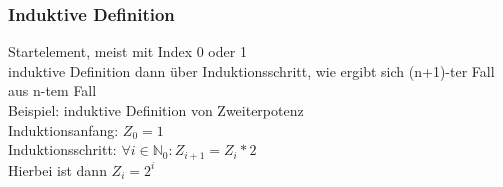 \documentclass{beamer}
\begin{document}
	\begin{frame}
		\frametitle{Induktive Definition}
		Startelement, meist mit Index 0 oder 1\\
		induktive Definition dann über Induktionsschritt, wie ergibt sich (n+1)-ter Fall aus n-tem Fall\\
		Beispiel: induktive Definition von Zweiterpotenz\\
		Induktionsanfang: $Z_{0} = 1$\\
		Induktionsschritt: $\forall i\in \mathbb{N}_0 : Z_{i+1} = Z_{i} * 2$\\
		Hierbei ist dann $Z_{i} = 2^{i}$
	\end{frame}
\end{document}
